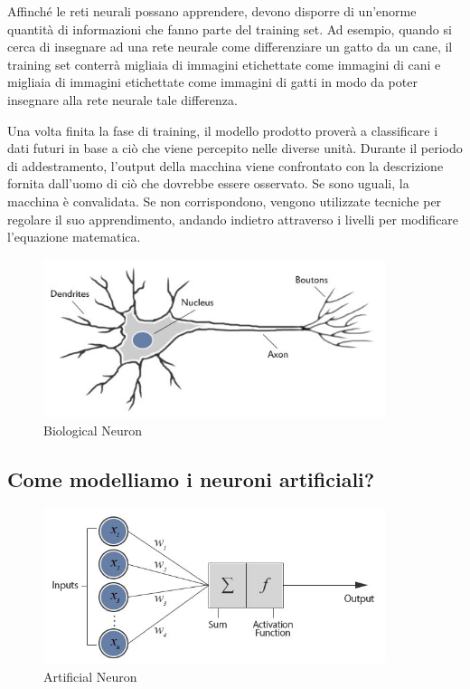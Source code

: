 Affinché le reti neurali possano apprendere, devono disporre di un'enorme quantità di informazioni che fanno parte del training set. Ad esempio, quando si cerca di insegnare ad una rete neurale come differenziare un gatto da un cane, il training set conterrà migliaia di immagini etichettate come immagini di cani e migliaia di immagini etichettate come immagini di gatti in modo da poter insegnare alla rete neurale tale differenza.


Una volta finita la fase di training, il modello prodotto proverà a classificare i dati futuri in base a ciò che viene percepito nelle diverse unità. Durante il periodo di addestramento, l'output della macchina viene confrontato con la descrizione fornita dall'uomo di ciò che dovrebbe essere osservato. Se sono uguali, la macchina è convalidata. Se non corrispondono, vengono utilizzate tecniche per regolare il suo apprendimento, andando indietro attraverso i livelli per modificare l'equazione matematica.
\newline
\begin{figure}[h!]
	\centering
	\includegraphics[width=100mm]{img/3/nn_1_1}
	\caption{\fontsize{10px}{0mm}\selectfont Biological Neuron \label{fig:nn_1_2}}
\end{figure}

\newpage
\subsection{Come modelliamo i neuroni artificiali?}

\begin{figure}[h!]
	\centering
	\includegraphics[width=100mm]{img/3/nn_1_2}
	\caption{\fontsize{10px}{0mm}\selectfont Artificial Neuron \label{fig:nn_1_2}}
\end{figure}



